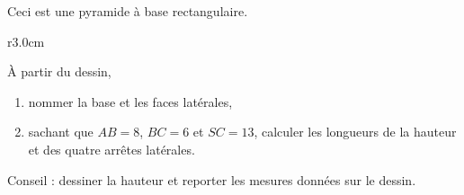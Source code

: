 
\begin{exercice}\label{exo2smath-0181}

    Ceci est une pyramide à base rectangulaire.

\begin{wrapfigure}{r}{3.0cm}
   \vspace{-0.5cm}        %
   \centering
   
\end{wrapfigure}
À partir du dessin,
\begin{enumerate}
    \item
        nommer la base et les faces latérales,
    \item
        sachant que \( AB=8\), \( BC=6\) et \( SC=13\), calculer les longueurs de la hauteur et des quatre arrêtes latérales.
\end{enumerate}

Conseil : dessiner la hauteur et reporter les mesures données sur le dessin.

\end{exercice}

